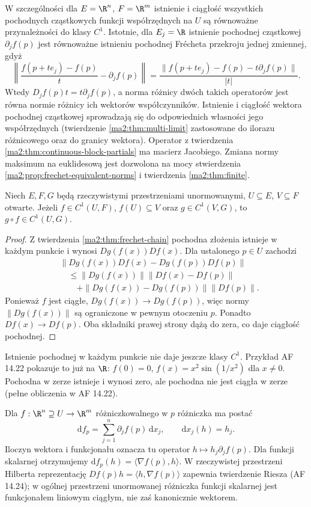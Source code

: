 W szczególności dla $E=\R^n$, $F=\R^m$
istnienie i ciągłość wszystkich pochodnych cząstkowych
funkcji współrzędnych na $U$ są równoważne
przynależności do klasy $C^1$.
Istotnie, dla $E_j=\R$ istnienie pochodnej cząstkowej
$\partial_j f(p)$ jest równoważne istnieniu pochodnej
Frécheta przekroju jednej zmiennej, gdyż
\[
 \left\|\frac{f(p+te_j)-f(p)}{t}-\partial_j f(p)\right\|
 =\frac{\|f(p+te_j)-f(p)-t\partial_j f(p)\|}{|t|}.
\]
Wtedy $D_jf(p)t=t\partial_j f(p)$, a norma różnicy
dwóch takich operatorów jest równa normie różnicy
ich wektorów współczynników. Istnienie i ciągłość
wektora pochodnej cząstkowej sprowadzają się do
odpowiednich własności jego współrzędnych
(twierdzenie \ref{ma2:thm:multi-limit} zastosowane
do ilorazu różnicowego oraz do granicy wektora).
Operator z twierdzenia
\ref{ma2:thm:continuous-block-partials} ma macierz
Jacobiego. Zmiana normy maksimum na euklidesową
jest dozwolona na mocy stwierdzenia
\ref{ma2:prop:frechet-equivalent-norms} i twierdzenia
\ref{ma2:thm:finite}.

\begin{wniosek}
\label{ma2:cor:c1-chain}
Niech $E,F,G$ będą rzeczywistymi przestrzeniami
unormowanymi, $U\subseteq E$, $V\subseteq F$ otwarte.
Jeżeli $f\in C^1(U,F)$, $f(U)\subseteq V$ oraz
$g\in C^1(V,G)$, to $g\circ f\in C^1(U,G)$.
\end{wniosek}
\begin{proof}
Z twierdzenia \ref{ma2:thm:frechet-chain} pochodna
złożenia istnieje w każdym punkcie i wynosi
$Dg(f(x))Df(x)$. Dla ustalonego $p\in U$ zachodzi
\begin{align*}
 &\|Dg(f(x))Df(x)-Dg(f(p))Df(p)\|\\
 &\quad\le \|Dg(f(x))\|\|Df(x)-Df(p)\|\\
 &\qquad+\|Dg(f(x))-Dg(f(p))\|\|Df(p)\|.
\end{align*}
Ponieważ $f$ jest ciągłe, $Dg(f(x))\to Dg(f(p))$,
więc normy $\|Dg(f(x))\|$ są ograniczone w pewnym
otoczeniu $p$. Ponadto $Df(x)\to Df(p)$. Oba składniki
prawej strony dążą do zera, co daje ciągłość pochodnej.
\end{proof}

Istnienie pochodnej w każdym punkcie nie daje jeszcze
klasy $C^1$. Przykład AF 14.22 pokazuje to już na
$\R$: $f(0)=0$, $f(x)=x^2\sin(1/x^2)$ dla $x\ne0$.
Pochodna w zerze istnieje i wynosi zero, ale pochodna
nie jest ciągła w zerze (pełne obliczenia w AF 14.22).

Dla $f:\R^n\supseteq U\to\R^m$ różniczkowalnego w $p$
różniczka ma postać
\[
 \mathrm df_p=\sum_{j=1}^n\partial_j f(p)\,\mathrm dx_j,
 \qquad \mathrm dx_j(h)=h_j.
\]
Iloczyn wektora i funkcjonału oznacza tu operator
$h\mapsto h_j\partial_j f(p)$. Dla funkcji skalarnej
otrzymujemy $\mathrm df_p(h)=\langle\nabla f(p),h\rangle$.
W rzeczywistej przestrzeni Hilberta reprezentację
$Df(p)h=\langle h,\nabla f(p)\rangle$ zapewnia
twierdzenie Riesza (AF 14.24); w ogólnej przestrzeni
unormowanej różniczka funkcji skalarnej jest funkcjonałem
liniowym ciągłym, nie zaś kanonicznie wektorem.

